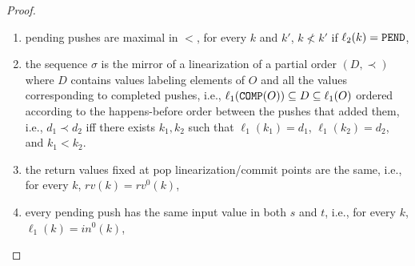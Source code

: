 \begin{proof}
\begin{enumerate}
	\item pending pushes are maximal in $<$, for every $k$ and $k'$, $k \not< k'$ if $\ell_2(k)={\tt PEND}$,
	\item\label{item:stack_fs_lin} the sequence $\sigma$ is the mirror of a linearization of a partial order $(D,\prec)$ where $D$ contains values labeling elements of $O$ and all the values corresponding to completed pushes, i.e., $\ell_1({\tt COMP}(O))\subseteq D\subseteq \ell_1(O)$ ordered according to the happens-before order between the pushes that added them, i.e., $d_1\prec d_2$ if{f} there exists $k_1,k_2$ such that $\ell_1(k_1)=d_1$, $\ell_1(k_2)=d_2$, and $k_1 < k_2$.
	\item the return values fixed at pop linearization/commit points are the same, i.e., for every $k$, $rv(k)=rv^0(k)$,
	\item every pending push has the same input value in both $s$ and $t$, i.e., for every $k$, $\ell_1(k)=in^0(k)$,
\end{enumerate}


\end{proof}
